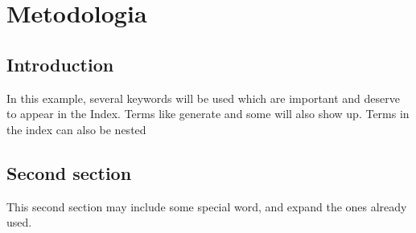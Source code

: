 \chapter{Metodologia}

\section{Introduction}
In this example, several keywords will be used which
are important and deserve to appear in the Index. Terms like generate and some will also
show up. Terms in the index can also be nested 

\section{Second section}
This second section may include some special word,
and expand the ones already used.
